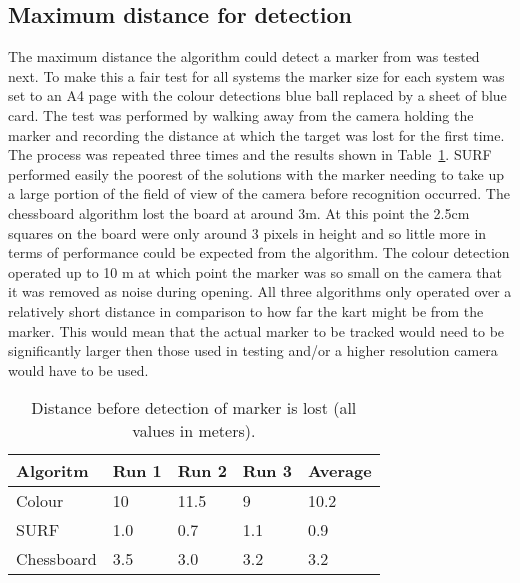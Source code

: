 \subsection{Maximum distance for detection}
The maximum distance the algorithm could detect a marker from was tested next. To make this a fair test for all systems the marker size for each system was set to an A4 page with the colour detections blue ball replaced by a sheet of blue card. The test was performed by walking away from the camera holding the marker and recording the distance at which the target was lost for the first time. The process was repeated three times and the results shown in Table~\ref{dist}. SURF performed easily the poorest of the solutions with the marker needing to take up a large portion of the field of view of the camera before recognition occurred. The chessboard algorithm lost the board at around 3m. At this point the 2.5cm squares on the board were only around 3 pixels in height and so little more in terms of performance could be expected from the algorithm. The colour detection operated up to 10 m at which point the marker was so small on the camera that it was removed as noise during opening. All three algorithms only operated over a relatively short distance in comparison to how far the kart might be from the marker. This would mean that the actual marker to be tracked would need to be significantly larger then those used in testing and/or a higher resolution camera would have to be used.

\begin{table}
	\begin{center}
    	\begin{tabular}{ | l | l | l | l | l |}
    	\hline
    	Algoritm & Run 1 & Run 2 & Run 3 & Average \\ \hline
		Colour & 10 & 11.5 & 9 & 10.2 \\ \hline
		SURF & 1.0 & 0.7 & 1.1 & 0.9 \\ \hline
		Chessboard & 3.5 & 3.0 & 3.2 & 3.2 \\ \hline
    	\end{tabular}
	\end{center}
	
	\caption{Distance before detection of marker is lost (all values in meters).}
	\label{dist}
	
\end{table}

